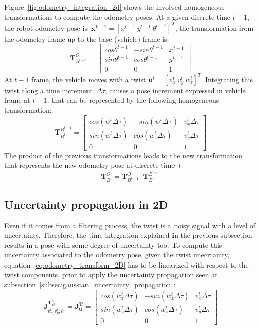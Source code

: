 Figure~\ref{fig:odometry_integration_2d} shows the involved homogeneous transformations to compute the odometry poses. At a given discrete time $t-1$, the robot odometry pose is~$\mathbf{x^{t-1}}=[x^{t-1}\ y^{t-1}\ \theta^{t-1}]^T$, the transformation from the odometry frame up to the base (vehicle) frame is: 
\begin{equation}
 \mathbf{T}^O_{B^{t-1}} = 
 \left[
 \begin{array}{ccc}
  cos\theta^{t-1} & -sin\theta^{t-1} & x^{t-1} \\
  sin\theta^{t-1} &  cos\theta^{t-1} & y^{t-1} \\
  0 & 0 & 1
 \end{array}
 \right]
\end{equation}
At $t-1$ frame, the vehicle moves with a twist $\mathbf{u}^t=[v^t_x\ v^t_y\ w^t_z]^T$. Integrating this twist along a time increment~$\Delta\tau$, causes a pose increment expressed in vehicle frame at $t-1$, that can be represented by the following homogeneous transformation: 
\begin{equation}
 \mathbf{T}^{B^{t-1}}_{B^t} = 
 \left[
 \begin{array}{ccc}
  cos(w_z^t\Delta\tau) & -sin(w_z^t\Delta\tau) & v_x^t\Delta\tau\\
  sin(w_z^t\Delta\tau) &  cos(w_z^t\Delta\tau) & v_y^t\Delta\tau \\
  0 & 0 & 1
 \end{array}
 \right]
 \label{eq:odometry_increment}
\end{equation}
The product of the previous transformations leads to the new transformation that represents the new odometry pose at discrete time~$t$: 
\begin{equation}
\mathbf{T}^O_{B^t} = \mathbf{T}^O_{B^{t-1}} \cdot \mathbf{T}^{B^{t-1}}_{B^t}
\label{eq:odometry_transform_2D}
\end{equation}


\subsection{Uncertainty propagation in 2D}
Even if it comes from a filtering process, the twist is a noisy signal with a level of uncertainty. Therefore, the time integration explained in the previous subsection results in a pose with some degree of uncertainty too. To compute this uncertainty associated to the  odometry pose, given the twist unecrtainty, equation~\ref{eq:odometry_transform_2D} has to be linearized with respect to the twist components, prior to apply the uncertainty propagation seen at subsection~\ref{subsec:gaussian_uncertainty_propagation}: 
\begin{equation}
\mathbf{J}^{\mathbf{T}^{O}_{B^t} }_{v^t_x, v^t_y, \theta^t}= 
\mathbf{J}^{\mathbf{T}}_{\mathbf{u}} = 
 \left[
 \begin{array}{ccc}
  cos(w_z^t\Delta\tau) & -sin(w_z^t\Delta\tau) & v_x^t\Delta\tau\\
  sin(w_z^t\Delta\tau) &  cos(w_z^t\Delta\tau) & v_y^t\Delta\tau \\
  0 & 0 & 1
 \end{array}
 \right]
 \label{eq:odometry_jacobian}
\end{equation}

